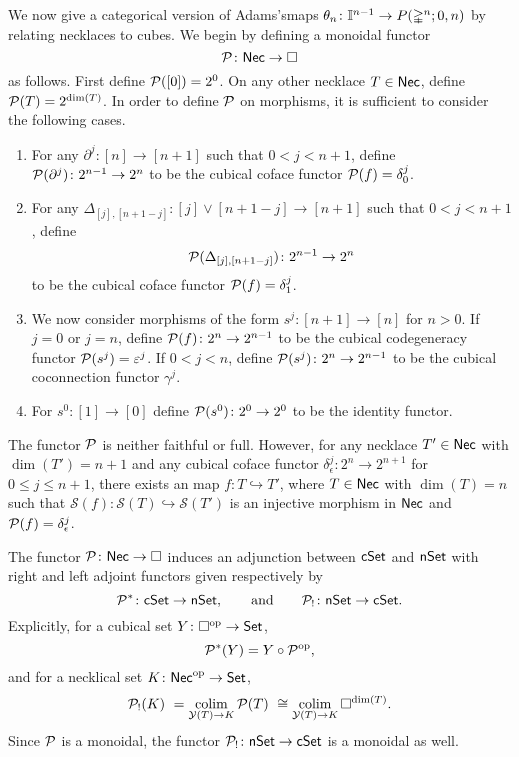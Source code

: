 We now give a categorical version of Adams'smaps $\theta_n \colon \mathbb{I}^{n-1} \to P(\mathbb{\Delta}^{n};0,n)$ by relating necklaces to cubes. We begin by defining a monoidal functor
\[
\mathcal{P} \colon \mathsf{Nec} \to \square
\]
as follows. First define $\mathcal{P}([0])=2^0$.
On any other necklace $T \in \mathsf{Nec}$, define $\mathcal{P}(T) = 2^{\dim(T)}$.
In order to define $\mathcal{P}$ on morphisms, it is sufficient to consider the following cases.
\begin{enumerate}
	\item For any $\partial^j \colon [n] \to [n+1]$ such that $0< j<{n+1}$, define $\mathcal{P}(\partial^j) \colon 2^{n-1}\to 2^{n}$ to be the cubical coface functor $\mathcal{P}(f)= \delta_0^{j}$.

	\item For any $\Delta_{[j], [n+1-j]} \colon [j] \vee [n+1-j] \to [n+1]$ such that $0<j<n+1$, define
	\[
	\mathcal{P}(\Delta_{[j], [n+1-j]}) \colon 2^{n-1}\to 2^{n}
	\]
	to be the cubical coface functor $\mathcal{P}(f)=\delta_1^{j}$.

	\item We now consider morphisms of the form $s^j \colon [n+1] \to [n]$ for $n>0$.
	If $j=0$ or $j=n$, define $\mathcal{P}(f) \colon 2^n \to 2^{n-1}$ to be the cubical codegeneracy functor $\mathcal{P}(s^j)= \varepsilon^{j}$.
	If $0<j<n$, define $\mathcal{P}(s^j) \colon 2^n \to 2^{n-1}$ to be the cubical coconnection functor $\gamma^{j}$.

	\item For $s^0 \colon [1] \to [0]$ define $\mathcal{P}(s^0) \colon 2^0 \to 2^0$ to be the identity functor.
\end{enumerate}

\begin{remark}
	The functor $\mathcal{P}$ is neither faithful or full.
	However, for any necklace $T' \in \mathsf{Nec}$ with $\dim(T')=n+1$ and any cubical coface functor $\delta_{\epsilon}^j \colon 2^n \to 2^{n+1}$ for $0 \leq j \leq n+1$, there exists an map $f \colon T \hookrightarrow T'$, where $T \in \mathsf{Nec}$ with $\dim(T)=n$ such that $\mathcal{S}(f) \colon \mathcal{S}(T) \hookrightarrow \mathcal{S}(T')$ is an injective morphism in $\mathsf{Nec}$ and $\mathcal{P}(f) = \delta_{\epsilon}^j$.

\end{remark}

The functor $\mathcal{P} \colon \mathsf{Nec} \to \square$ induces an adjunction between $\mathsf{cSet}$ and $\mathsf{nSet}$ with right and left adjoint functors given respectively by
\[
\mathcal{P}^\ast \colon \mathsf{cSet} \to \mathsf{nSet},
\qquad \text{and} \qquad
\mathcal{P}_{!} \colon \mathsf{nSet} \to \mathsf{cSet}.
\]
Explicitly, for a cubical set $Y \colon \square^{\mathrm{op}} \to \mathsf{Set}$,
\[
\mathcal{P}^\ast(Y)= Y \circ \mathcal{P}^{\mathrm{op}},
\]
and for a necklical set $K \colon \mathsf{Nec}^{\mathrm{op}} \to \mathsf{Set}$,
\[
\mathcal{P}_{!}(K) \ =
\operatorname*{colim}_{\mathcal{Y}(T) \to K} \mathcal{P}(T) \ \cong
\operatorname*{colim}_{\mathcal{Y}(T) \to K} \square^{\dim(T)}.
\]
Since $\mathcal{P}$ is a monoidal, the functor $\mathcal{P}_{!} \colon \mathsf{nSet} \to \mathsf{cSet}$ is a monoidal as well.

